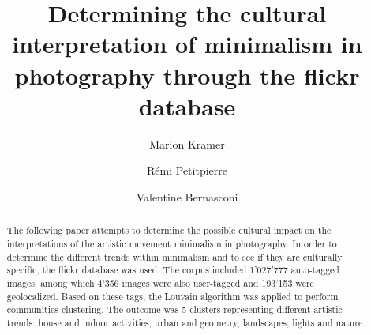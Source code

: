 \documentclass[sigconf]{acmart}
\begin{document}
\title{Determining the cultural interpretation of minimalism in photography through the flickr database}

\author{Marion Kramer}

\author{Rémi Petitpierre}

\author{Valentine Bernasconi}


\renewcommand{\shortauthors}{Petitpierre, et al.}

\begin{abstract}
  The following paper attempts to determine the possible cultural impact on the interpretations of the artistic movement minimalism in photography. In order to determine the different trends within minimalism and to see if they are culturally specific, the flickr database was used. The corpus included 1'027'777 auto-tagged images, among which 4'356  images were also user-tagged and 193'153 were geolocalized. Based on these tags, the Louvain algorithm was applied to perform communities clustering. The outcome was 5 clusters representing different artistic trends: house and indoor activities, urban and geometry, landscapes, lights and nature.
\end{abstract}



\makeatletter
\def\@copyrightspace{\relax}
\makeatother
\maketitle
\end{document}
